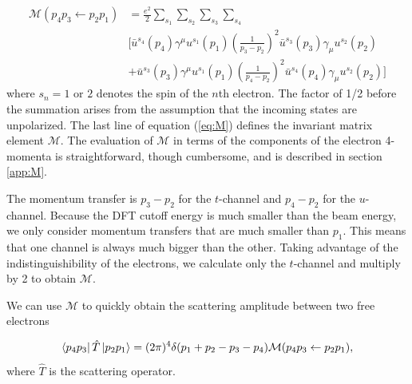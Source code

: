 \documentclass{article}
\begin{document}
\begin{equation}
\label{eq:M}
\begin{aligned}
    \mathcal{M}(p_4p_3\leftarrow p_2p_1)
    &=
    \frac{e^2}{2}
    \sum_{s_1}\sum_{s_2}\sum_{s_3}\sum_{s_4}
    \\&
    \bigg[
    \bar{u}^{s_4}\left(p_4\right)\gamma^{\mu}u^{s_1}\left(p_1\right)
    \left(\frac{1}{p_3 - p_2}\right)^2
    \bar{u}^{s_3}\left(p_3\right)\gamma_{\mu}u^{s_2}\left(p_2\right)
    \\&+
    \bar{u}^{s_3}\left(p_3\right)\gamma^{\mu}u^{s_1}\left(p_1\right)
    \left(\frac{1}{p_4 - p_2}\right)^2
    \bar{u}^{s_4}\left(p_4\right)\gamma_{\mu}u^{s_2}\left(p_2\right)
    \bigg]
\end{aligned}
\end{equation}
%
where $s_n = 1\text{ or }2$ denotes the spin of the $n$th electron.  The factor of 1/2 before the summation arises from the assumption that the incoming states are unpolarized.  The last line of equation (\ref{eq:M}) defines the invariant matrix element $\mathcal{M}$.
The evaluation of $\mathcal{M}$ in terms of the components of the electron 4-momenta is straightforward, though cumbersome, and is described in section \ref{app:M}.

The momentum transfer is $p_3 - p_2$ for the $t$-channel and $p_4 - p_2$ for the $u$-channel.  Because the DFT cutoff energy is much smaller than the beam energy, we only consider momentum transfers that are much smaller than $p_1$.  This means that one channel is always much bigger than the other.  Taking advantage of the indistinguishibility of the electrons, we calculate only the $t$-channel and multiply by 2 to obtain $\mathcal{M}$.

We can use $\mathcal{M}$ to quickly obtain the scattering amplitude between two free electrons

\begin{equation}
\label{eq:T}
    \bra{p_4 p_3}\hat{T}\ket{p_2p_1}
    =
    (2\pi)^4\delta(p_1 + p_2 - p_3 - p_4)
    \mathcal{M}(p_4p_3\leftarrow p_2p_1),
\end{equation}
%
where $\hat{T}$ is the scattering operator.
\end{document}
